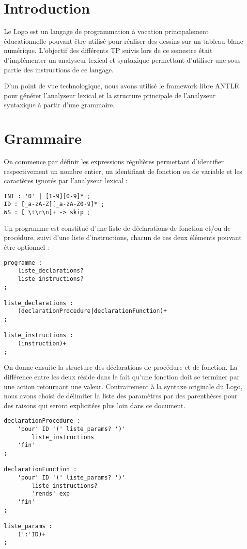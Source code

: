 \documentclass[a4paper,11pt]{article}
\begin{document}


\newpage
\section{Introduction}
Le Logo est un langage de programmation à vocation principalement éducationnelle pouvant être utilisé pour réaliser des dessins sur un tableau blanc numérique.
L'objectif des différents TP suivis lors de ce semestre était d'implémenter un analyseur lexical et syntaxique permettant d'utiliser une sous-partie des instructions de ce langage.

D'un point de vue technologique, nous avons utilisé le framework libre ANTLR pour générer l'analyseur lexical et la structure principale de l'analyseur syntaxique à partir d'une grammaire.

\section{Grammaire}
On commence par définir les expressions régulières permettant d'identifier respectivement un nombre entier, un identifiant de fonction ou de variable et les caractères ignorés par l'analyseur lexical :
\begin{lstlisting}
INT : '0' | [1-9][0-9]* ;
ID : [_a-zA-Z][_a-zA-Z0-9]* ;
WS : [ \t\r\n]+ -> skip ;
\end{lstlisting}

Un programme est constitué d'une liste de déclarations de fonction et/ou de procédure, suivi d'une liste d'instructions, chacun de ces deux éléments pouvant être optionnel :
\begin{lstlisting}
programme :
    liste_declarations?
    liste_instructions?
;

liste_declarations :
    (declarationProcedure|declarationFunction)+
;

liste_instructions :
    (instruction)+
;
\end{lstlisting}

On donne ensuite la structure des déclarations de procédure et de fonction.
La différence entre les deux réside dans le fait qu'une fonction doit se terminer par une action retournant une valeur.
Contrairement à la syntaxe originale du Logo, nous avons choisi de délimiter la liste des paramètres par des parenthèses pour des raisons qui seront explicitées plus loin dans ce document.
\begin{lstlisting}
declarationProcedure :
    'pour' ID '(' liste_params? ')'
        liste_instructions
    'fin'
;

declarationFunction :
    'pour' ID '(' liste_params? ')'
        liste_instructions?
        'rends' exp
    'fin'
;

liste_params :
    (':'ID)+
;
\end{lstlisting}
\end{document}
